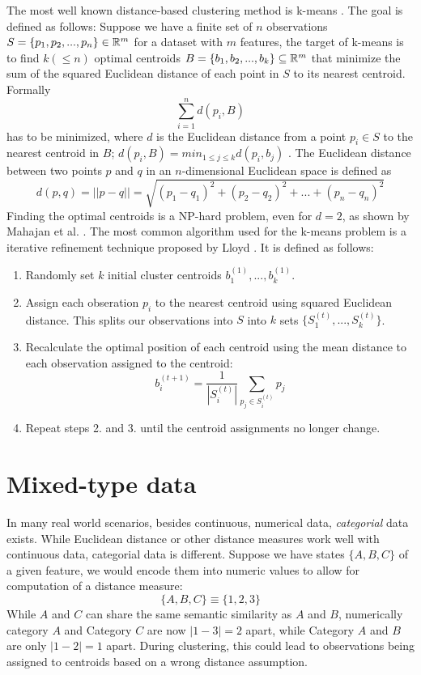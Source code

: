 The most well known distance-based clustering method is k-means \cite{kmeans}. The goal is defined as follows: Suppose we have a finite set of $n$ observations $S=\{p_1, p_2, ..., p_n\} \in \mathbb{R}^m$ for a dataset with $m$ features, the target of k-means is to find $k (\leq n)$ optimal centroids $B=\{b_1, b_2, ..., b_k\} \subseteq \mathbb{R}^m$ that minimize the sum of the squared Euclidean distance of each point in $S$ to its nearest centroid. Formally
$$\sum_{i=1}^n  d(p_i, B)$$
has to be minimized, where $d$ is the Euclidean distance from a point $p_i \in S$ to the nearest centroid in $B$; $d(p_i, B) = min_{1 \leq j \leq k} d(p_i, b_j)$ \cite{kmeans_np_hard}. The Euclidean distance between two points $p$ and $q$ in an $n$-dimensional Euclidean space is defined as 
$$d(p, q) = || p - q || = \sqrt{(p_1 - q_1)^2 + (p_2 - q_2)^2 + ... + (p_n - q_n)^2}$$
Finding the optimal centroids is a NP-hard problem, even for $d=2$, as shown by Mahajan et al. \cite{kmeans_np_hard}. The most common algorithm used for the k-means problem is a iterative refinement technique proposed by Lloyd \cite{kmeans_lloyd}. It is defined as follows:
\begin{enumerate} 
	\item Randomly set $k$ initial cluster centroids $b_1^{(1)}, ..., b_k^{(1)}$.
	\item Assign each obseration $p_i$ to the nearest centroid using squared Euclidean distance. This splits our observations into $S$ into $k$ sets $\{S_1^{(t)}, ..., S_k^{(t)}\}$.
	\item Recalculate the optimal position of each centroid using the mean distance to each observation assigned to the centroid: 
$$b_i^{(t+1)} = \frac{1}{|S_i^{(t)}|} \sum_{p_j \in S_i^{(t)}} p_j$$
	\item Repeat steps 2. and 3. until the centroid assignments no longer change.
\end{enumerate}

\section{Mixed-type data}

In many real world scenarios, besides continuous, numerical data, \textit{categorial} data exists. While Euclidean distance or other distance measures work well with continuous data, categorial data is different. Suppose we have states $\{A, B, C\}$ of a given feature, we would encode them into numeric values to allow for computation of a distance measure:
$$\{A, B, C\} \equiv \{1, 2, 3\}$$
While $A$ and $C$ can share the same semantic similarity as $A$ and $B$, numerically category $A$ and Category $C$ are now $|1-3| = 2$ apart, while Category $A$ and $B$ are only $|1-2|=1$ apart. During clustering, this could lead to observations being assigned to centroids based on a wrong distance assumption.

